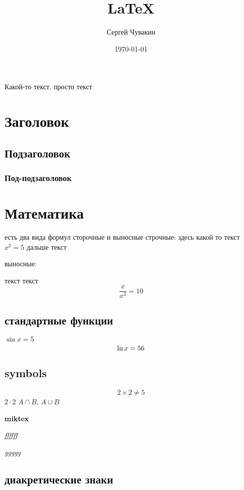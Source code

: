 \documentclass[a4paper,12pt]{article} %
\author{Сергей Чувакин }
\title{\LaTeX}
\date{\today}
\begin{document}
	\maketitle  %
Какой-то текст, просто текст

\section*{Заголовок} 

\subsection{Подзаголовок}

\subsubsection{Под-подзаголовок}
	


\section{Математика}

есть два вида формул сторочные и выносные
строчные: здесь какой то текст $x^2 = 5$ дальше текст 


выносные: 

текст текст $$\frac{x}{x^3} = 10$$

\subsection{стандартные функции}

$\sin x = 5$
$$\ln x = 56\\$$

\subsection{symbols}
$$2\times2 \ne 5$$
$2\cdot2$
$A\cap B$, $A\cup B$

\textbf{\Huge{miktex}}

\emph{ffffff}

{\em   ggggg}

\subsection{диакретические знаки}
\end{document}
